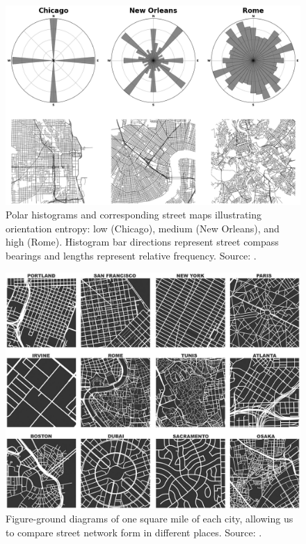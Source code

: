 \documentclass[12pt,letterpaper]{article} %
\begin{document}
\begin{figure}[tb]
    \centering
    \includegraphics[width=1\textwidth]{fig_street_orientations.png}
    \caption{Polar histograms and corresponding street maps illustrating orientation entropy: low (Chicago), medium (New Orleans), and high (Rome). Histogram bar directions represent street compass bearings and lengths represent relative frequency. Source: \citet{barthelemy_review_2024}.}\label{fig:street_orientations}
\end{figure}

\begin{figure}[tb]
\centering
\includegraphics[width=1\textwidth]{fig_figure_ground.jpg}
\caption{Figure-ground diagrams of one square mile of each city, allowing us to compare street network form in different places. Source: \citet{boeing_spatial_2021}.}\label{fig:figure_ground}
\end{figure}
\end{document}
